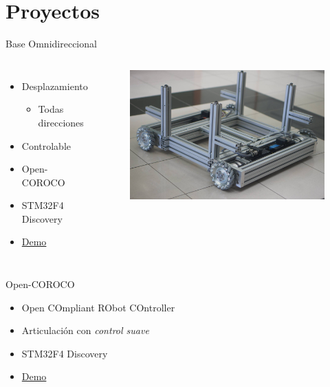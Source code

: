 \documentclass[10pt]{beamer}
\begin{document}
\section{Proyectos}

\begin{frame}{Base Omnidireccional}
	\begin{columns}
			\begin{itemize}
            	\item Desplazamiento
                	 \begin{itemize}
                	 	\item Todas direcciones 
                	 \end{itemize}
                \item Controlable
				\item Open-COROCO
                \item STM32F4 Discovery
                \item \href{https://www.facebook.com/ArcosLab/videos/vb.476608722370710/878271378871107/?type=2&theater}{Demo}
			\end{itemize}
			\begin{center}
				\begin{figure}
					\includegraphics[width=1\textwidth]{img/base.jpg}
				\end{figure}
			\end{center}
	\end{columns}
\end{frame}

\begin{frame}{Open-COROCO}
	\begin{itemize}
		\item Open COmpliant RObot COntroller
        \item Articulación con \textit{control suave}
        \item STM32F4 Discovery
        \item \href{https://www.facebook.com/ArcosLab/videos/vb.476608722370710/814718461893066/?type=2&theater}{Demo}
	\end{itemize}
\end{frame}
\end{document}
